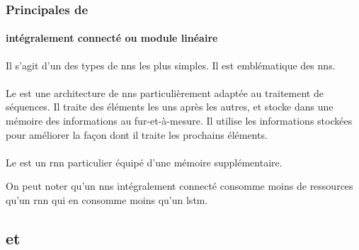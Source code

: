
\subsubsection{Principales  de }
\paragraph{ intégralement connecté ou module linéaire}
Il s'agit d'un des types de \glspl{nn} les plus simples. Il est emblématique des \glspl{nn}.

\paragraph{} \label{def:rnn}
Le  est une \gls{architecture} de \glspl{nn} particulièrement adaptée au traitement de séquences.
Il traite des éléments les uns après les autres, et stocke dans une \og mémoire \fg{} des informations au fur-et-à-mesure.
Il utilise les informations stockées pour améliorer la façon dont il traite les prochains éléments.

\paragraph{} \label{def:lstm}
Le  est un \gls{rnn} particulier équipé d'une mémoire supplémentaire.

On peut noter qu'un \glspl{nn} intégralement connecté consomme moins de ressources qu'un \gls{rnn} qui en consomme moins qu'un \gls{lstm}.

\subsection{ et }
